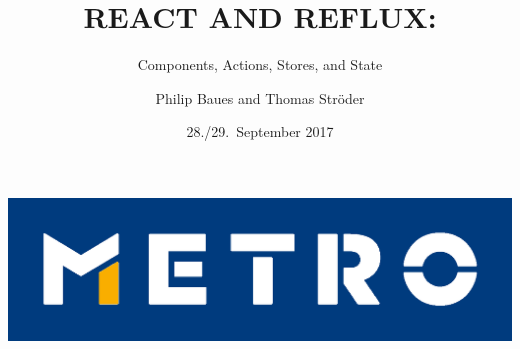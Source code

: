 \documentclass{beamer}
\begin{document}
\title[React and Reflux]{REACT AND REFLUX:}
\subtitle{Components, Actions, Stores, and State}
\author[P.\ Baues, T.\ Str\"oder]{Philip Baues and Thomas Str\"oder}
\date{28./29.\ September 2017}
\newcommand{\location}{\texttt{code.talks} Hamburg}

{
\begin{frame}[plain]
\centering
\includegraphics{metro2.png}
\end{frame}
}

{
\begin{frame}[plain]
\titlepage
\end{frame}
}

\end{document}
